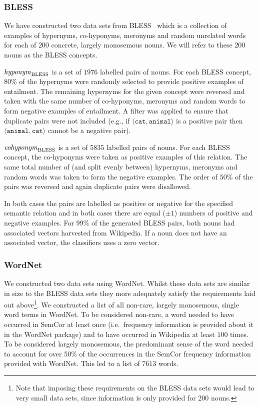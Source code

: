 \documentclass[11pt]{article}
\newcommand\entBLESS{\mbox{\em hyponym\/}_{\mbox{\scriptsize BLESS}}}
\newcommand\coordBLESS{\mbox{\em cohyponym\/}_{\mbox{\scriptsize BLESS}}}
\begin{document}
\subsubsection{BLESS}

We have constructed two  data sets from BLESS~\cite{Baroni2011} which is a collection of examples of hypernyms, co-hyponyms, meronyms and random unrelated words for each of $200$ concrete, largely monosemous nouns. We will refer to these $200$ nouns as the BLESS concepts.

\smallskip

\noindent $\entBLESS$ is a set of $1976$ labelled pairs of nouns.  For each BLESS concept, 80\% of the hypernyms were randomly selected to provide positive examples of entailment.  The remaining hypernyms for the given concept were reversed and taken with the same number of co-hyponyms, meronyms and random words to form negative examples of entailment.  A filter was applied to ensure that duplicate pairs were not included (e.g., if $\langle\texttt{cat},\texttt{animal}\rangle$ is a positive pair then $\langle\texttt{animal},\texttt{cat}\rangle$ cannot be a negative pair). 

\smallskip

\noindent $\coordBLESS$ is a set of 5835 labelled pairs of nouns.  For each BLESS concept, the co-hyponyms were taken as positive examples of this relation.  The same total number of (and split evenly between) hypernyms, meronyms and random words was taken to form the negative examples.  The order of 50\% of the pairs was reversed and again duplicate pairs were disallowed. 

\smallskip

In both cases the pairs are labelled as positive or negative for the specified semantic relation and in both cases there are equal ($\pm 1$) numbers of positive and negative examples.  For 99\% of the generated BLESS pairs, both nouns had associated vectors harvested from Wikipedia.  If a noun does not have an associated vector, the classifiers uses a zero vector.  

\subsubsection{WordNet}

We  constructed two data sets using WordNet.  Whilst these data sets are similar in size to the BLESS data sets they more adequately satisfy the requirements laid out above\footnote{Note that imposing these requirements on the BLESS data sets would lead to very small data sets, since information is only provided for $200$ nouns.}.  We constructed a list of all non-rare, largely monosemous, single word terms in WordNet.  To be considered non-rare, a word needed to have occurred in SemCor at least once (i.e.~frequency information is provided about it in the WordNet package) and to have occurred in Wikipedia at least $100$ times.  To be considered largely monosemous, the predominant sense of the word needed to account for over 50\% of the occurrences in the SemCor frequency information provided with WordNet.  This led to a list of $7613$ words. 
\end{document}
